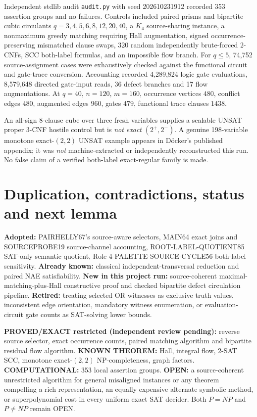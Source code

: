 \documentclass[10pt]{article}
\begin{document}
Independent stdlib audit \texttt{audit.py} with seed 202610231912 recorded 353 assertion groups and no failures. Controls included paired prisms and bipartite cubic circulants $q=3,4,5,6,8,12,20,40$, a $K_4$ source-sharing instance, a nonmaximum greedy matching requiring Hall augmentation, signed occurrence-preserving mismatched clause swaps, 320 random independently brute-forced 2-CNFs, SCC both-label formulas, and an impossible flow branch. For $q\le5$, 74,752 source-assignment cases were exhaustively checked against the functional circuit and gate-trace conversion. Accounting recorded 4,289,824 logic gate evaluations, 8,579,648 directed gate-input reads, 36 defect branches and 17 flow augmentations. At $q=40$, $n=120$, $m=160$, occurrence vertices $480$, conflict edges $480$, augmented edges $960$, gates $479$, functional trace clauses $1438$.

An all-sign 8-clause cube over three fresh variables supplies a scalable UNSAT proper 3-CNF hostile control but is \emph{not exact} $(2^+,2^-)$. A genuine 198-variable monotone exact-$(2,2)$ UNSAT example appears in D\"ocker's published appendix; it was \emph{not} machine-extracted or independently reconstructed this run. No false claim of a verified both-label exact-regular family is made.

\section{Duplication, contradictions, status and next lemma}
\textbf{Adopted:} PAIRHELLY67's source-aware selectors, MAIN64 exact joins and SOURCEPROBE19 source-channel accounting, ROOT-LABEL-QUOTIENT85 SAT-only semantic quotient, Role 4 PALETTE-SOURCE-CYCLE56 both-label sensitivity. \textbf{Already known:} classical independent-transversal reduction and paired NAE satisfiability. \textbf{New in this project run:} source-coherent maximal-matching-plus-Hall constructive proof and checked bipartite defect circulation pipeline. \textbf{Retired:} treating selected OR witnesses as exclusive truth values, inconsistent edge orientation, mandatory witness enumeration, or evaluation-circuit gate counts as SAT-solving lower bounds.

\textbf{PROVED/EXACT restricted (independent review pending):} reverse source selector, exact occurrence counts, paired matching algorithm and bipartite residual flow algorithm. \textbf{KNOWN THEOREM:} Hall, integral flow, 2-SAT SCC, monotone exact-$(2,2)$ NP-completeness, graph factors. \textbf{COMPUTATIONAL:} 353 local assertion groups. \textbf{OPEN:} a source-coherent unrestricted algorithm for general misaligned instances or any theorem compelling a rich representation, an equally expensive alternate symbolic method, or superpolynomial cost in every uniform exact SAT decider. Both $P=NP$ and $P\ne NP$ remain OPEN.
\end{document}
